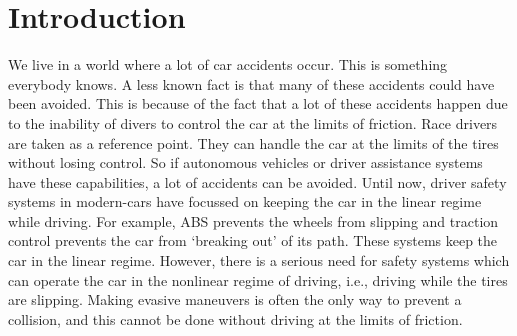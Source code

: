 \section{Introduction}
We live in a world where a lot of car accidents occur. This is something everybody knows. A less known fact is that many of these accidents could have been avoided. This is because of the fact that a lot of these accidents happen due to the inability of divers to control the car at the limits of friction. Race drivers are taken as a reference point. They can handle the car at the limits of the tires without losing control. So if autonomous vehicles or driver assistance systems have these capabilities, a lot of accidents can be avoided. 
	Until now, driver safety systems in modern-cars have focussed on keeping the car in the linear regime while driving. For example, ABS prevents the wheels from slipping and traction control prevents the car from ‘breaking out’ of its path. These systems keep the car in the linear regime. However, there is a serious need for safety systems which can operate the car in the nonlinear regime of driving, i.e., driving while the tires are slipping. Making evasive maneuvers is often the only way to prevent a collision, and this cannot be done without driving at the limits of friction.
